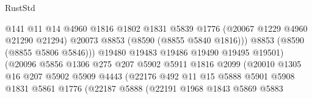 \begin{lexlean}{RustStd}
\begin{coremodule}
                                          @141
                                          @11
                                          @14
                                          @4960
                                          @1816
                                          @1802
                                          @1831
                                          @5839
                                          @1776
                                          (@20067 @1229 @4960 @21290 @21294)
                                          @20073
                                          @8853
                                          (@8590 (@8855 @5840 @1816)))
                                        @8853
                                        (@8590 (@8855 @5806 @5846)))
                                      @19480
                                      @19483
                                      @19486
                                      @19490
                                      @19495
                                      @19501)
                                    (@20096
                                      @5856
                                      @1306
                                      @275
                                      @207
                                      @5902
                                      @5911
                                      @1816
                                      @2099
                                      (@20010
                                        @1305
                                        @16
                                        @207
                                        @5902
                                        @5909
                                        @4443
                                        (@22176
                                          @492
                                          @11
                                          @15
                                          @5888
                                          @5901
                                          @5908
                                          @1831
                                          @5861
                                          @1776
                                          (@22187
                                            @5888
                                            (@22191
                                              @1968
                                              @1843
                                              @5869
                                              @5883

\end{coremodule}
\end{lexlean}
